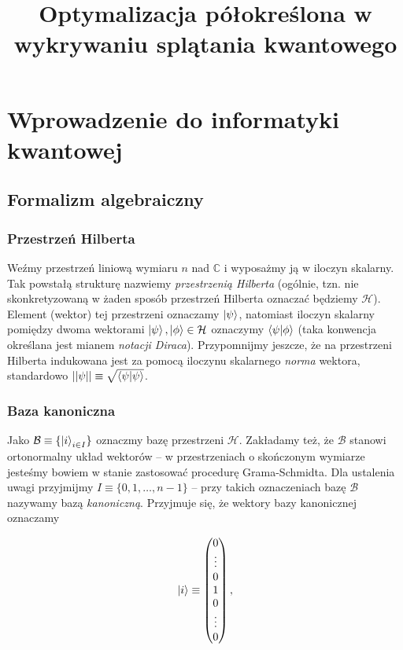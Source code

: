 \documentclass[a4paper,12pt]{article}
\title{Optymalizacja półokreślona w wykrywaniu splątania kwantowego}
\date{}
\begin{document}
\maketitle
\tableofcontents

\section{Wprowadzenie do informatyki kwantowej}

\subsection{Formalizm algebraiczny}

\subsubsection{Przestrzeń Hilberta}

Weźmy przestrzeń liniową wymiaru $n$ nad $\mathbb{C}$ i wyposażmy ją w iloczyn skalarny. Tak powstałą strukturę nazwiemy \textit{przestrzenią Hilberta} (ogólnie, tzn. nie skonkretyzowaną w żaden sposób przestrzeń Hilberta oznaczać będziemy $\mathcal{H}$). Element (wektor) tej przestrzeni oznaczamy $\ket{\psi}$, natomiast iloczyn skalarny pomiędzy dwoma wektorami $\ket{\psi}, \ket{\phi} \in \mathcal{H}$ oznaczymy $\bra{\psi}\ket{\phi}$ (taka konwencja określana jest mianem \textit{notacji Diraca}). Przypomnijmy jeszcze, że na przestrzeni Hilberta indukowana jest za pomocą iloczynu skalarnego \textit{norma} wektora, standardowo $||\psi|| \equiv \sqrt{\bra{\psi}\ket{\psi}}$.

\subsubsection{Baza kanoniczna}

Jako $\mathcal{B} \equiv \{\ket{i}_{i\in I}\}$ oznaczmy bazę przestrzeni $\mathcal{H}$. Zakładamy też, że $\mathcal{B}$ stanowi ortonormalny układ wektorów -- w przestrzeniach o skończonym wymiarze jesteśmy bowiem w stanie zastosować procedurę Grama-Schmidta. Dla ustalenia uwagi przyjmijmy $I \equiv \{0,1, \ldots , n - 1 \}$ -- przy takich oznaczeniach bazę $\mathcal{B}$ nazywamy bazą \textit{kanoniczną}. Przyjmuje się, że wektory bazy kanonicznej oznaczamy

$$
    \ket{i} \equiv
    \begin{pmatrix}
        0 \\
        \vdots \\
        0 \\
        1 \\
        0 \\
        \vdots \\
        0
    \end{pmatrix},
$$
\end{document}
